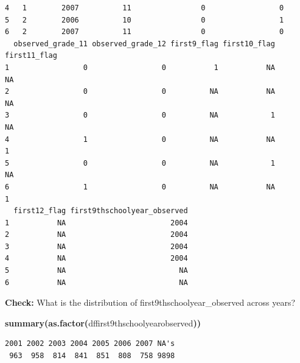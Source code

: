 \documentclass[12pt]{article}
\makeatletter
\newcommand{\hlfunctioncall}[1]{\textcolor[rgb]{0.501960784313725,0,0.329411764705882}{\textbf{#1}}}%
\newcommand{\hlkeyword}[1]{\textcolor[rgb]{0,0,0}{\textbf{#1}}}%
\newcommand{\hlsymbol}[1]{\textcolor[rgb]{0,0,0}{#1}}%
\newenvironment{kframe}{%
 \def\FrameCommand##1{\hskip\@totalleftmargin \hskip-\fboxsep
 \colorbox{shadecolor}{##1}\hskip-\fboxsep
     \hskip-\linewidth \hskip-\@totalleftmargin \hskip\columnwidth}%
 \MakeFramed {\advance\hsize-\width
   \@totalleftmargin\z@ \linewidth\hsize
   \@setminipage}}%
 {\par\unskip\endMakeFramed}
\newenvironment{knitrout}{}{} %
\renewenvironment{knitrout}{\begin{footnotesize}}{\end{footnotesize}}
\makeatother
\begin{document}
\begin{knitrout}
\begin{kframe}
\begin{verbatim}
4   1        2007          11                0                 0
5   2        2006          10                0                 1
6   2        2007          11                0                 0
  observed_grade_11 observed_grade_12 first9_flag first10_flag first11_flag
1                 0                 0           1           NA           NA
2                 0                 0          NA           NA           NA
3                 0                 0          NA            1           NA
4                 1                 0          NA           NA            1
5                 0                 0          NA            1           NA
6                 1                 0          NA           NA            1
  first12_flag first9thschoolyear_observed
1           NA                        2004
2           NA                        2004
3           NA                        2004
4           NA                        2004
5           NA                          NA
6           NA                          NA
\end{verbatim}
\end{kframe}
\end{knitrout}


\textbf{Check:} What is the distribution of first9thschoolyear\_observed across years?

\begin{knitrout}
\color{fgcolor}\begin{kframe}
\begin{flushleft}
\ttfamily\noindent
\hlfunctioncall{summary}\hlkeyword{(}\hlfunctioncall{as.factor}\hlkeyword{(}\hlsymbol{df}\hlkeyword{\usebox{\hlnormalsizeboxdollar}}\hlsymbol{first9thschoolyear\usebox{\hlnormalsizeboxunderscore}observed}\hlkeyword{)}\hlkeyword{)}\mbox{}
\normalfont
\end{flushleft}
\begin{verbatim}
2001 2002 2003 2004 2005 2006 2007 NA's 
 963  958  814  841  851  808  758 9898 
\end{verbatim}
\end{kframe}
\end{knitrout}
\end{document}
